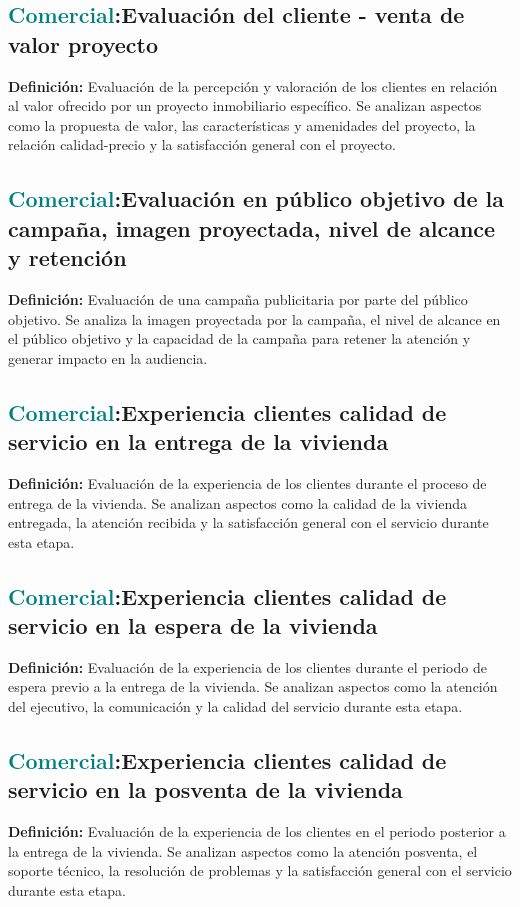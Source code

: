 \documentclass[12pt]{article}
\begin{document}
\subsection{\textcolor{teal}{Comercial}:{Evaluación del cliente - venta de valor proyecto}}
\textbf{Definición:} Evaluación de la percepción y valoración de los clientes en relación al valor ofrecido por un proyecto inmobiliario específico. Se analizan aspectos como la propuesta de valor, las características y amenidades del proyecto, la relación calidad-precio y la satisfacción general con el proyecto.
\subsection{\textcolor{teal}{Comercial}:{Evaluación en público objetivo de la campaña, imagen proyectada, nivel de alcance y retención}}
\textbf{Definición:} Evaluación de una campaña publicitaria por parte del público objetivo. Se analiza la imagen proyectada por la campaña, el nivel de alcance en el público objetivo y la capacidad de la campaña para retener la atención y generar impacto en la audiencia.
\subsection{\textcolor{teal}{Comercial}:{Experiencia clientes calidad de servicio en la entrega de la vivienda}}
\textbf{Definición:} Evaluación de la experiencia de los clientes durante el proceso de entrega de la vivienda. Se analizan aspectos como la calidad de la vivienda entregada, la atención recibida y la satisfacción general con el servicio durante esta etapa.
\subsection{\textcolor{teal}{Comercial}:{Experiencia clientes calidad de servicio en la espera de la vivienda}}
\textbf{Definición:} Evaluación de la experiencia de los clientes durante el periodo de espera previo a la entrega de la vivienda. Se analizan aspectos como la atención del ejecutivo, la comunicación y la calidad del servicio durante esta etapa.
\subsection{\textcolor{teal}{Comercial}:{Experiencia clientes calidad de servicio en la posventa de la vivienda}}
\textbf{Definición:} Evaluación de la experiencia de los clientes en el periodo posterior a la entrega de la vivienda. Se analizan aspectos como la atención posventa, el soporte técnico, la resolución de problemas y la satisfacción general con el servicio durante esta etapa.
\end{document}
